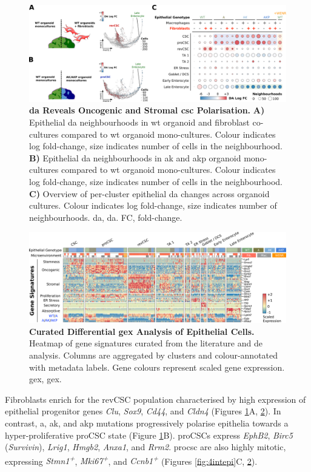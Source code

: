 \begin{figure}[H]
    \centering
    \includegraphics{04seq/figs/4SEQ_DA.png}
    \caption{\textbf{\acrshort{da} Reveals Oncogenic and Stromal \acrshort{csc} Polarisation.} \textbf{A)} Epithelial \acrshort{da} neighbourhoods in \acrshort{wt} organoid and fibroblast co-cultures compared to \acrshort{wt} organoid mono-cultures. Colour indicates log fold-change, size indicates number of cells in the neighbourhood. \textbf{B)} Epithelial \acrshort{da} neighbourhoods in \acrshort{ak} and \acrshort{akp} organoid mono-cultures compared to \acrshort{wt} organoid mono-cultures. Colour indicates log fold-change, size indicates number of cells in the neighbourhood. \textbf{C)} Overview of per-cluster epithelial \acrshort{da} changes across organoid cultures. Colour indicates log fold-change, size indicates number of neighbourhoods. \acrshort{da}, \acrlong{da}. FC, fold-change.}
    \label{fig:4da}
\end{figure}
\begin{figure}
    \centering
    \includegraphics{04seq/figs/4SEQ_DE.png}
    \caption{\textbf{Curated Differential \acrshort{gex} Analysis of Epithelial Cells.} Heatmap of gene signatures curated from the literature and \acrshort{de} analysis. Columns are aggregated by clusters and colour-annotated with metadata labels. Gene colours represent scaled gene expression. \acrshort{gex}, \acrlong{gex}.}
    \label{fig:4de}
\end{figure}

Fibroblasts enrich for the revCSC population characterised by high expression of epithelial progenitor genes \emph{Clu}, \emph{Sox9}, \emph{Cd44}, and \emph{Cldn4} (Figures \ref{fig:4da}A, \ref{fig:4de}). In contrast, \acrshort{a}, \acrshort{ak}, and \acrshort{akp} mutations progressively polarise epithelia towards a hyper-proliferative proCSC state (Figure \ref{fig:4da}B). proCSCs express \textit{EphB2}, \textit{Birc5} (\textit{Survivin}), \textit{Lrig1}, \textit{Hmgb2}, \textit{Anxa1}, and \textit{Rrm2}. \acrshort{procsc} are also highly mitotic, expressing \textit{Stmn1\textsuperscript{+}}, \textit{Mki67\textsuperscript{+}}, and \textit{Ccnb1\textsuperscript{+}} (Figures \ref{fig:4intepi}C, \ref{fig:4de}). 

